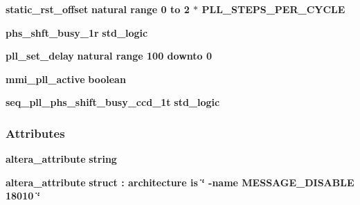 \begin{DoxyCompactItemize}
\item 
{\bf static\+\_\+rst\+\_\+offset} {\bfseries \textcolor{comment}{natural}\textcolor{vhdlchar}{ }\textcolor{vhdlchar}{ }\textcolor{vhdlchar}{ }\textcolor{keywordflow}{range}\textcolor{vhdlchar}{ }\textcolor{vhdlchar}{ } \textcolor{vhdldigit}{0} \textcolor{vhdlchar}{ }\textcolor{keywordflow}{to}\textcolor{vhdlchar}{ }\textcolor{vhdlchar}{ } \textcolor{vhdldigit}{2} \textcolor{vhdlchar}{$\ast$}\textcolor{vhdlchar}{ }\textcolor{vhdlchar}{ }\textcolor{vhdlchar}{ }{\bfseries {\bf P\+L\+L\+\_\+\+S\+T\+E\+P\+S\+\_\+\+P\+E\+R\+\_\+\+C\+Y\+C\+LE}} \textcolor{vhdlchar}{ }} 
\item 
{\bf phs\+\_\+shft\+\_\+busy\+\_\+1r} {\bfseries \textcolor{comment}{std\+\_\+logic}\textcolor{vhdlchar}{ }} 
\item 
{\bf pll\+\_\+set\+\_\+delay} {\bfseries \textcolor{comment}{natural}\textcolor{vhdlchar}{ }\textcolor{vhdlchar}{ }\textcolor{vhdlchar}{ }\textcolor{keywordflow}{range}\textcolor{vhdlchar}{ }\textcolor{vhdlchar}{ } \textcolor{vhdldigit}{100} \textcolor{vhdlchar}{ }\textcolor{keywordflow}{downto}\textcolor{vhdlchar}{ }\textcolor{vhdlchar}{ } \textcolor{vhdldigit}{0} \textcolor{vhdlchar}{ }} 
\item 
{\bf mmi\+\_\+pll\+\_\+active} {\bfseries \textcolor{comment}{boolean}\textcolor{vhdlchar}{ }} 
\item 
{\bf seq\+\_\+pll\+\_\+phs\+\_\+shift\+\_\+busy\+\_\+ccd\+\_\+1t} {\bfseries \textcolor{comment}{std\+\_\+logic}\textcolor{vhdlchar}{ }} 
\end{DoxyCompactItemize}
\subsubsection*{Attributes}
 \begin{DoxyCompactItemize}
\item 
{\bf altera\+\_\+attribute} {\bfseries \textcolor{comment}{string}\textcolor{vhdlchar}{ }} 
\item 
{\bf altera\+\_\+attribute} {\bfseries \textcolor{vhdlchar}{struct}\textcolor{vhdlchar}{ }\textcolor{vhdlchar}{\+:}\textcolor{vhdlchar}{ }\textcolor{keywordflow}{architecture}\textcolor{vhdlchar}{ }\textcolor{keywordflow}{is}\textcolor{vhdlchar}{ }\textcolor{vhdlchar}{ }\textcolor{vhdlchar}{ }\textcolor{vhdlchar}{ }\textcolor{keyword}{\char`\"{} -\/name M\+E\+S\+S\+A\+G\+E\+\_\+\+D\+I\+S\+A\+B\+L\+E 18010 \char`\"{}}\textcolor{vhdlchar}{ }} 
\end{DoxyCompactItemize}
